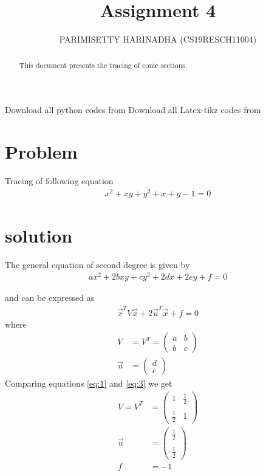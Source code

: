 \documentclass[journal,12pt,twocolumn]{IEEEtran}
\title{Assignment 4}
\author{PARIMISETTY HARINADHA (CS19RESCH11004)}
\newcommand{\myvec}[1]{\ensuremath{\begin{pmatrix}#1\end{pmatrix}}}
\begin{document}
\maketitle
\newpage
\begin{abstract}
This document presents the tracing of conic sections.
\end{abstract}
Download all python codes from 
Download all Latex-tikz codes from 
\section{Problem}
Tracing of following equation
\begin{align}
    x^2+xy+y^2+x+y-1=0 \label{eq:1}
\end{align}
\section{solution}
The general equation of second degree is given by
\begin{align}
ax^2+2bxy+cy^2+2dx+2ey+f=0 
\end{align}

and can be expressed as
\begin{align}
\vec{x}^T V\vec{x}+2\vec{u}^T\vec{x}+f=0 \label{eq:3}
\end{align}
where
\begin{align}
V &= V^T = \myvec{a & b \\ b & c}\label{eq:4}
\\
\vec{u} &= \myvec{d \\ e}
\end{align}
Comparing equations \eqref{eq:1} and \eqref{eq:3} we get
\begin{align}
V=V^T&=\myvec{1 & \frac{1}{2} \\\\ \frac{1}{2} &1} \\
    \vec{u}&=\myvec{\frac{1}{2} \\\\\frac{1}{2} } \\
    f&=-1
\end{align}   
\end{document}
